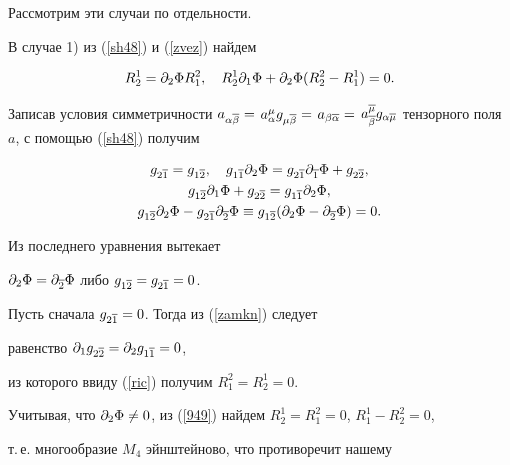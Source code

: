 Рассмотрим эти случаи по отдельности.





В случае 1) из (\ref{sh48}) и (\ref{zvez}) найдем


\begin{equation}


\label{949}


R^1_2=\pl 2 \Phi R^2_1, \quad R^1_2 \pl 1 \Phi + \pl 2 \Phi (R^2_2 -


R^1_1)=0.


\end{equation}


Записав условия симметричности $a_{\alpha\ol\beta} =$ $a^\mu_\alpha


g_{\mu\ol\beta}=$ $a_{\beta\ol\alpha} =$ $a^{\ol\mu}_{\ol\beta}


g_{\alpha\ol\mu}$ тензорного поля $a$, с помощью (\ref{sh48}) получим


\begin{gather}


\label{sh50}


g_{2\ol 1} =g_{1\ol 2}, \quad g_{1\ol 1}\pl 2 \Phi =


g_{2\ol 1}\pl{\ol 1}\Phi + g_{2\ol 2},\\


\label{sh51}


g_{1\ol 2} \pl 1 \Phi + g_{2\ol 2} = g_{1\ol 1} \pl 2 \Phi,\\


g_{1\ol 2}\pl 2 \Phi - g_{2\ol 1}\pl{\ol 2}\Phi \equiv


g_{1\ol 2}(\pl 2 \Phi - \pl{\ol 2}\Phi) =0.\notag


\end{gather}


Из последнего уравнения вытекает


$\partial_ 2 \Phi =\partial_{\overline 2} \Phi$ либо $g_{1\overline 2} = g_{2\overline 1} = 0$.





Пусть сначала $g_{2\overline 1} = 0$. Тогда из (\ref{zamkn}) следует


равенство $\partial_ 1 g_{2\overline 2} = \partial_ 2 g_{1\overline 1} = 0$,


из которого ввиду (\ref{ric}) получим $R_1^2=R^1_2=0$.


Учитывая, что $\pl 2\Phi


\neq 0$, из (\ref{949}) найдем $R^1_2 =R^2_1= 0$, $R^1_1-R_2^2=0$,


т.\,е. многообразие $M_4$ эйнштейново, что противоречит нашему


